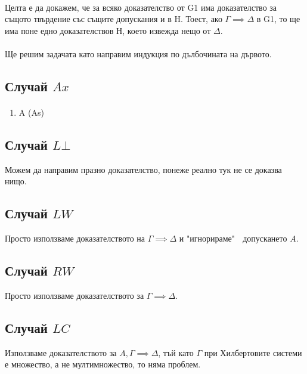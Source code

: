 \documentclass[12pt]{article}
\begin{document}
\newcommand\alphaeq{\mathrel{\stackrel{\makebox[0pt]{\mbox{\normalfont\tiny $\alpha$}}}{=}}}
\newcommand\betaeq{\mathrel{\stackrel{\makebox[0pt]{\mbox{\normalfont\tiny $\beta$}}}{=}}}
\newcommand\betaetaeq{\mathrel{\stackrel{\makebox[0pt]{\mbox{\normalfont\tiny $\beta\eta$}}}{=}}}

\paragraph*{}
Целта е да докажем, че за всяко доказателство от G1 има доказателство за същото твърдение със същите допускания и в H. Тоест, ако $\Gamma \implies \Delta$ в G1, то ще има поне едно доказателствов Н, което извежда нещо от $\Delta$.

\paragraph*{}
Ще решим задачата като направим индукция по дълбочината на дървото. 

\subsection*{Случай $Ax$}
\paragraph*{}
\begin{enumerate}
    \item A (As)
\end{enumerate}
\subsection*{Случай $L \bot$}
Можем да направим празно доказателство, понеже реално тук не се доказва нищо.
\subsection*{Случай $LW$}
Просто използваме доказателството на $\Gamma \implies \Delta$ и "игнорираме" $\;$ допускането $A$. 
\subsection*{Случай $RW$}
Просто използваме доказателството за $\Gamma \implies \Delta$.
\subsection*{Случай $LC$}
Използваме доказателството за $A, \Gamma \implies \Delta$, тъй като $\Gamma$ при Хилбертовите системи е множество, а не мултимножество, то няма проблем.
\end{document}
